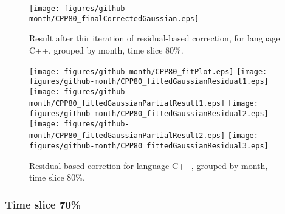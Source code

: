 \begin{figure}[]
\centering
{\texttt{[image: figures/github-month/CPP80\_finalCorrectedGaussian.eps]}}
\caption{Result after thir iteration of residual-based correction, for language C++, grouped by month, time slice 80\%.}
\end{figure}


\begin{figure}[hb]
\centering
{}
{\texttt{[image: figures/github-month/CPP80\_fitPlot.eps]}}
{\texttt{[image: figures/github-month/CPP80\_fittedGaussianResidual1.eps]}}
{\texttt{[image: figures/github-month/CPP80\_fittedGaussianPartialResult1.eps]}}
{\texttt{[image: figures/github-month/CPP80\_fittedGaussianResidual2.eps]}}
{\texttt{[image: figures/github-month/CPP80\_fittedGaussianPartialResult2.eps]}}
{\texttt{[image: figures/github-month/CPP80\_fittedGaussianResidual3.eps]}}
\caption{Residual-based corretion for language C++, grouped by month, time slice 80\%.}
\end{figure}


\clearpage 
\newpage 


\FloatBarrier

\subsubsection{Time slice 70\%}

